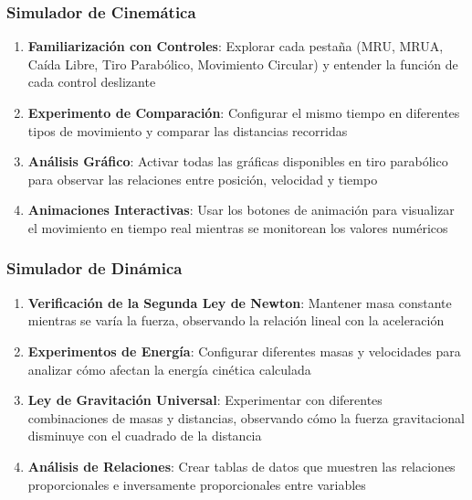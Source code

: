 \subsubsection{Simulador de Cinemática}
\begin{enumerate}
    \item \textbf{Familiarización con Controles}: Explorar cada pestaña (MRU, MRUA, Caída Libre, Tiro Parabólico, Movimiento Circular) y entender la función de cada control deslizante
    \item \textbf{Experimento de Comparación}: Configurar el mismo tiempo en diferentes tipos de movimiento y comparar las distancias recorridas
    \item \textbf{Análisis Gráfico}: Activar todas las gráficas disponibles en tiro parabólico para observar las relaciones entre posición, velocidad y tiempo
    \item \textbf{Animaciones Interactivas}: Usar los botones de animación para visualizar el movimiento en tiempo real mientras se monitorean los valores numéricos
\end{enumerate}

\subsubsection{Simulador de Dinámica}
\begin{enumerate}
    \item \textbf{Verificación de la Segunda Ley de Newton}: Mantener masa constante mientras se varía la fuerza, observando la relación lineal con la aceleración
    \item \textbf{Experimentos de Energía}: Configurar diferentes masas y velocidades para analizar cómo afectan la energía cinética calculada
    \item \textbf{Ley de Gravitación Universal}: Experimentar con diferentes combinaciones de masas y distancias, observando cómo la fuerza gravitacional disminuye con el cuadrado de la distancia
    \item \textbf{Análisis de Relaciones}: Crear tablas de datos que muestren las relaciones proporcionales e inversamente proporcionales entre variables
\end{enumerate}

